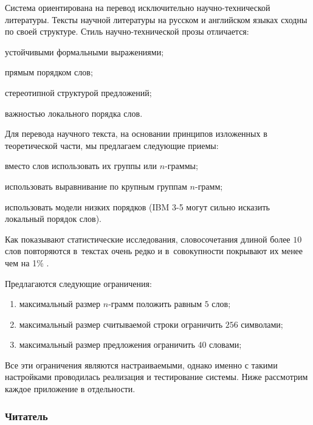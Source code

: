 Система ориентирована на перевод исключительно 
научно-технической литературы. 
Тексты научной литературы на русском и английском языках 
сходны по своей структуре.
Стиль научно-технической прозы отличается:
\begin{ditemize}
	\item устойчивыми формальными выражениями;
	\item прямым порядком слов;
	\item стереотипной структурой предложений;
	\item важностью локального порядка слов.
\end{ditemize}
Для перевода научного текста, на основании принципов изложенных в теоретической части, мы предлагаем следующие приемы:
\begin{ditemize}
	\item вместо слов использовать их группы или $n$-граммы;
	\item использовать выравнивание по крупным группам $n$-грамм;
	\item использовать модели низких порядков (IBM 3-5 могут сильно исказить локальный порядок слов).
\end{ditemize}
Как показывают статистические исследования, 
словосочетания длиной более $10$ слов 
повторяются в~текстах очень редко 
и в~совокупности покрывают их менее чем на 1\% \cite{Хорошилов:2006}.

\pagebreak

Предлагаются следующие ограничения:
{\renewcommand{\labelenumi}{\alph{enumi})}
\begin{enumerate}
	\item максимальный размер $n$-грамм положить равным $5$ слов;
	\item максимальный размер считываемой строки ограничить $256$ символами;
	\item максимальный размер предложения ограничить $40$ словами;
\end{enumerate}
}
Все эти ограничения являются настраиваемыми, однако именно 
с такими настройками проводилась реализация и тестирование системы.
Ниже рассмотрим каждое приложение в отдельности.


\subsubsection{Читатель}

